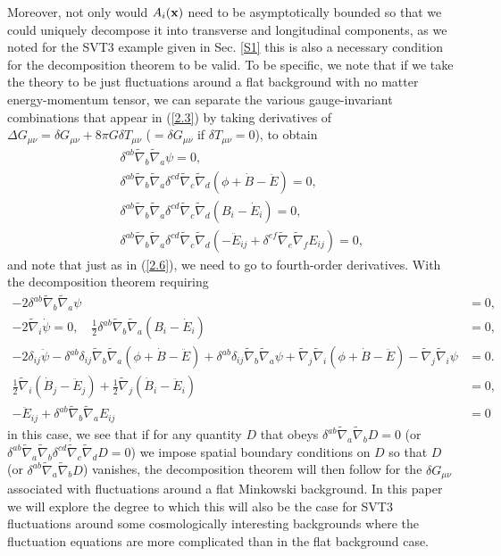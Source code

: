 \documentclass[aps,onecolumn,10pt]{revtex4}
\numberwithin{equation}{section}
\numberwithin{equation}{section}
\begin{document}
Moreover, not only would  $A_i({\bf x})$ need to be asymptotically bounded so that we could uniquely decompose it into transverse and longitudinal components, as we noted for the SVT3 example given in Sec. \ref{S1} this is also a necessary condition for the decomposition theorem to be valid. To be specific, we note that if we take the theory to be just fluctuations around a flat background with no matter energy-momentum tensor, we can separate the various gauge-invariant combinations that appear in (\ref{2.3}) by taking derivatives of $\Delta G_{\mu\nu}=\delta G_{\mu\nu}+8\pi G \delta T_{\mu\nu}$ ($=\delta G_{\mu\nu}$ if $\delta T_{\mu\nu}=0$), to obtain
%
\begin{eqnarray}
&&\delta^{ab} \tilde{\nabla}_{b}\tilde{\nabla}_{a}\psi=0,
\nonumber\\
 &&\delta^{ab} \tilde{\nabla}_{b}\tilde{\nabla}_{a} \delta^{cd} \tilde{\nabla}_{c}\tilde{\nabla}_{d}(\phi+\dot{B}  -\ddot{E})=0,
 \nonumber\\
 &&\delta^{ab} \tilde{\nabla}_{b}\tilde{\nabla}_{a} \delta^{cd} \tilde{\nabla}_{c}\tilde{\nabla}_{d}(B_i-\dot{E}_i)=0,
 \nonumber\\
 &&\delta^{ab} \tilde{\nabla}_{b}\tilde{\nabla}_{a} \delta^{cd} \tilde{\nabla}_{c}\tilde{\nabla}_{d}(-\ddot{E}_{ij}+\delta^{ef} \tilde{\nabla}_{e}\tilde{\nabla}_{f}E_{ij})=0,
\label{2.19}
\end{eqnarray}
%
and note that just as in (\ref{2.6}), we need to go to fourth-order derivatives. With the decomposition theorem requiring
%
\begin{align}
- 2 \delta^{ab} \tilde{\nabla}_{b}\tilde{\nabla}_{a}\psi&=0,
\nonumber\\
- 2 \tilde{\nabla}_{i}\dot{\psi}=0,\quad \tfrac{1}{2} \delta^{ab} \tilde{\nabla}_{b}\tilde{\nabla}_{a}(B_{i} -  \dot{E}_{i})&=0,
\nonumber\\
 -2 \delta_{ij} \ddot{\psi} -  \delta^{ab} \delta_{ij} \tilde{\nabla}_{b}\tilde{\nabla}_{a}(\phi+\dot{B}  -\ddot{E})+ \delta^{ab} \delta_{ij} \tilde{\nabla}_{b}\tilde{\nabla}_{a}\psi +\tilde{\nabla}_{j}\tilde{\nabla}_{i}(\phi+\dot{B} -  \ddot{E})  -  \tilde{\nabla}_{j}\tilde{\nabla}_{i}\psi&=0.
\nonumber\\
 \tfrac{1}{2} \tilde{\nabla}_{i}(\dot{B}_{j} - \ddot{E}_{j}) + \tfrac{1}{2} \tilde{\nabla}_{j}(\dot{B}_{i} 
- \ddot{E}_{i})&=0,
\nonumber\\
- \ddot{E}_{ij} + \delta^{ab} \tilde{\nabla}_{b}\tilde{\nabla}_{a}E_{ij}&=0
\label{2.20}
\end{align}
%
in this case, we see that if for any quantity $D$ that obeys  $\delta^{ab} \tilde{\nabla}_{a}\tilde{\nabla}_{b}D=0$ (or $\delta^{ab} \tilde{\nabla}_{a}\tilde{\nabla}_{b}\delta^{cd} \tilde{\nabla}_{c}\tilde{\nabla}_{d}D=0$) we impose spatial boundary conditions on $D$ so that $D$ (or $\delta^{ab} \tilde{\nabla}_{a}\tilde{\nabla}_{b}D$) vanishes,  the decomposition theorem will then follow for the $\delta G_{\mu\nu}$ associated with fluctuations around a flat Minkowski background. In this paper we will explore the degree to which this will also be the case for SVT3 fluctuations around some cosmologically interesting backgrounds where the fluctuation equations are more complicated than in the flat background case.
\end{document}
